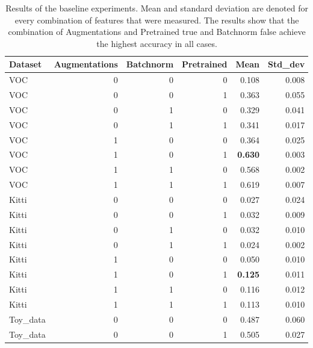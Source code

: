 \begin{table}[!htb]
	\centering
	\caption{Results of the baseline experiments. Mean and standard deviation are denoted for every combination of features that were measured. The results show that the combination of Augmentations and Pretrained true and Batchnorm false achieve the highest accuracy in all cases.}
	\begin{tabular}{lrrrrr}
		\toprule
		Dataset &  Augmentations &  Batchnorm &  Pretrained &   Mean &  Std\_dev \\
		\midrule
		VOC &              0 &          0 &           0 &  0.108 &    0.008 \\
		VOC &              0 &          0 &           1 &  0.363 &    0.055 \\
		VOC &              0 &          1 &           0 &  0.329 &    0.041 \\
		VOC &              0 &          1 &           1 &  0.341 &    0.017 \\
		VOC &              1 &          0 &           0 &  0.364 &    0.025 \\
		VOC &              1 &          0 &           1 &  \textbf{0.630} &    0.003 \\
		VOC &              1 &          1 &           0 &  0.568 &    0.002 \\
		VOC &              1 &          1 &           1 &  0.619 &    0.007 \\ \hdashline
		Kitti &              0 &          0 &           0 &  0.027 &    0.024 \\
		Kitti &              0 &          0 &           1 &  0.032 &    0.009 \\
		Kitti &              0 &          1 &           0 &  0.032 &    0.010 \\
		Kitti &              0 &          1 &           1 &  0.024 &    0.002 \\
		Kitti &              1 &          0 &           0 &  0.050 &    0.010 \\
		Kitti &              1 &          0 &           1 &  \textbf{0.125} &    0.011 \\
		Kitti &              1 &          1 &           0 &  0.116 &    0.012 \\
		Kitti &              1 &          1 &           1 &  0.113 &    0.010 \\ 
		\hdashline
		Toy\_data &              0 &          0 &           0 &  0.487 &    0.060 \\
		Toy\_data &              0 &          0 &           1 &  0.505 &    0.027 \\

\end{tabular}
\end{table}
